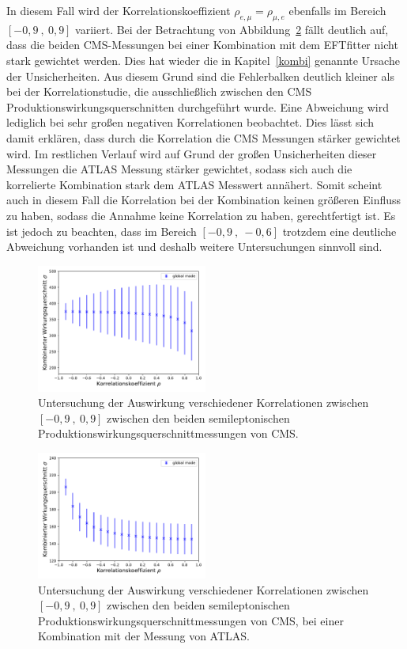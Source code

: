 In diesem Fall wird der Korrelationskoeffizient $\rho_{e, \mu}= \rho_{\mu, e}$ ebenfalls im Bereich $[-0,9~,~0,9]$ variiert. Bei der Betrachtung von Abbildung~\ref{fig:corrca} fällt deutlich auf, dass die beiden CMS-Messungen bei einer Kombination mit dem EFTfitter nicht stark gewichtet werden. Dies hat wieder die in Kapitel~\ref{kombi} genannte Ursache der Unsicherheiten. Aus diesem Grund sind die Fehlerbalken deutlich kleiner als bei der Korrelationstudie, die ausschließlich zwischen den CMS Produktionswirkungsquerschnitten durchgeführt wurde. Eine Abweichung wird lediglich bei sehr großen negativen Korrelationen beobachtet.
Dies lässt sich damit erklären, dass durch die Korrelation die CMS Messungen stärker gewichtet wird. Im restlichen Verlauf wird auf Grund der großen Unsicherheiten dieser Messungen die ATLAS Messung stärker gewichtet, sodass sich auch die korrelierte Kombination stark dem ATLAS Messwert annähert. Somit scheint auch in diesem Fall die Korrelation bei der Kombination keinen größeren Einfluss zu haben, sodass die Annahme keine Korrelation zu haben, gerechtfertigt ist. Es ist jedoch zu beachten, dass im Bereich $[-0,9~,~-0,6]$ trotzdem eine deutliche Abweichung vorhanden ist und deshalb weitere Untersuchungen sinnvoll sind.\\
\begin{figure}
  \centering
  \includegraphics[width=0.5\textwidth]{Plots/corr_CMS.pdf}
  \caption{Untersuchung der Auswirkung verschiedener Korrelationen zwischen $[-0,9~,~0,9]$ zwischen den beiden semileptonischen Produktionswirkungsquerschnittmessungen von CMS.}
  \label{fig:corrcms}
\end{figure}
\begin{figure}
  \centering
  \includegraphics[width=0.5\textwidth]{Plots/fcorr_cms.pdf}
  \caption{Untersuchung der Auswirkung verschiedener Korrelationen zwischen $[-0,9~,~0,9]$ zwischen den beiden semileptonischen Produktionswirkungsquerschnittmessungen von CMS, bei einer Kombination mit der Messung von ATLAS.}
  \label{fig:corrca}
\end{figure}
